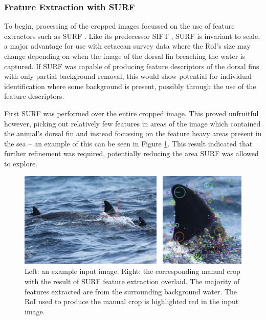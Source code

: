 \subsubsection{Feature Extraction with SURF}\label{ch:cetDet,sec:deciding,sub:boundingBoxInvestigation,subsub:SURF}

To begin, processing of the cropped images focussed on the use of feature extractors such as SURF \cite{bay_speeded-up_2008}. Like its predecessor SIFT \cite{lowe_object_1999}, SURF is invariant to scale, a major advantage for use with cetacean survey data where the RoI's size may change depending on when the image of the dorsal fin breaching the water is captured. If SURF was capable of producing feature descriptors of the dorsal fins with only partial background removal, this would show potential for individual identification where some background is present, possibly through the use of the feature descriptors.

First SURF was performed over the entire cropped image. This proved unfruitful however, picking out relatively few features in areas of the image which contained the animal's dorsal fin and instead focussing on the feature heavy areas present in the sea -- an example of this can be seen in Figure \ref{fig:manual-crop-surf-example}. This result indicated that further refinement was required, potentially reducing the area SURF was allowed to explore.

\begin{figure}
	\begin{center}
		\includegraphics[scale=0.6]{Chapter4/figs/manual-crop-surf-updated.png}
	\end{center}
	\caption[Left: an example input image. Right: the corresponding manual crop with the result of SURF feature extraction overlaid.]{Left: an example input image. Right: the corresponding manual crop with the result of SURF feature extraction overlaid. The majority of features extracted are from the surrounding background water. The RoI used to produce the manual crop is highlighted red in the input image.}
	\label{fig:manual-crop-surf-example}
\end{figure}

